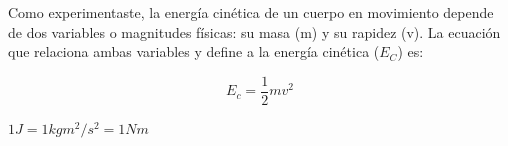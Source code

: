 \documentclass[11pt]{book}
\begin{document}
Como experimentaste, la energ\'ia cin\'etica de un cuerpo en movimiento depende de
dos variables o magnitudes f\'isicas: su masa (m) y su rapidez (v). La ecuaci\'on
que relaciona ambas variables y define a la energ\'ia cin\'etica ($E_C$) es:

\begin{equation*}
  E_c=\frac{1}{2}mv^2
\end{equation*}


\( 1 J = 1 kg m^2/s^2 = 1 Nm \)

\end{document}
